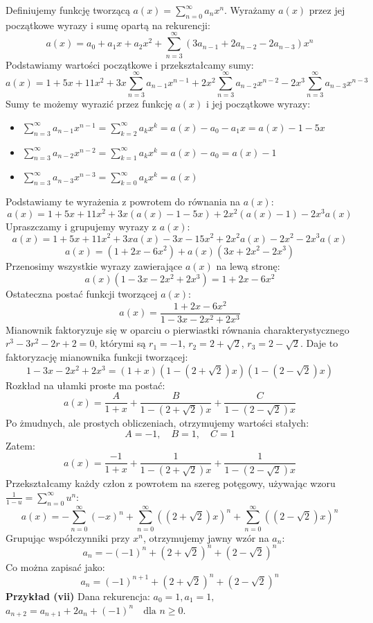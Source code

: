 \documentclass{mwart}
\begin{document}
\begin{mdframed}
    Definiujemy funkcję tworzącą $a(x) = \sum_{n=0}^{\infty} a_n x^n$.
    Wyrażamy $a(x)$ przez jej początkowe wyrazy i sumę opartą na rekurencji:
    $$ a(x) = a_0 + a_1 x + a_2 x^2 + \sum_{n=3}^{\infty} (3a_{n-1} + 2a_{n-2} - 2a_{n-3}) x^n $$
    Podstawiamy wartości początkowe i przekształcamy sumy:
    $$ a(x) = 1 + 5x + 11x^2 + 3x\sum_{n=3}^{\infty}a_{n-1}x^{n-1} + 2x^2\sum_{n=3}^{\infty}a_{n-2}x^{n-2} - 2x^3\sum_{n=3}^{\infty}a_{n-3}x^{n-3} $$
    Sumy te możemy wyrazić przez funkcję $a(x)$ i jej początkowe wyrazy:
    \begin{itemize}
        \item $ \sum_{n=3}^{\infty}a_{n-1}x^{n-1} = \sum_{k=2}^{\infty}a_{k}x^{k} = a(x) - a_0 - a_1x = a(x) - 1 - 5x $
        \item $ \sum_{n=3}^{\infty}a_{n-2}x^{n-2} = \sum_{k=1}^{\infty}a_{k}x^{k} = a(x) - a_0 = a(x) - 1 $
        \item $ \sum_{n=3}^{\infty}a_{n-3}x^{n-3} = \sum_{k=0}^{\infty}a_{k}x^{k} = a(x) $
    \end{itemize}
    Podstawiamy te wyrażenia z powrotem do równania na $a(x)$:
    $$ a(x) = 1 + 5x + 11x^2 + 3x(a(x) - 1 - 5x) + 2x^2(a(x) - 1) - 2x^3 a(x) $$
    Upraszczamy i grupujemy wyrazy z $a(x)$:
    $$ a(x) = 1 + 5x + 11x^2 + 3xa(x) - 3x - 15x^2 + 2x^2a(x) - 2x^2 - 2x^3a(x) $$
    $$ a(x) = (1 + 2x - 6x^2) + a(x)(3x + 2x^2 - 2x^3) $$
    Przenosimy wszystkie wyrazy zawierające $a(x)$ na lewą stronę:
    $$ a(x) (1 - 3x - 2x^2 + 2x^3) = 1 + 2x - 6x^2 $$
    Ostateczna postać funkcji tworzącej $a(x)$:
    $$ a(x) = \frac{1 + 2x - 6x^2}{1 - 3x - 2x^2 + 2x^3} $$
    Mianownik faktoryzuje się w oparciu o pierwiastki równania charakterystycznego $r^3 - 3r^2 - 2r + 2 = 0$, którymi są $r_1=-1$, $r_2=2+\sqrt{2}$, $r_3=2-\sqrt{2}$. Daje to faktoryzację mianownika funkcji tworzącej:
    $$ 1 - 3x - 2x^2 + 2x^3 = (1+x)(1-(2+\sqrt{2})x)(1-(2-\sqrt{2})x) $$
    Rozkład na ułamki proste ma postać:
    $$ a(x) = \frac{A}{1+x} + \frac{B}{1-(2+\sqrt{2})x} + \frac{C}{1-(2-\sqrt{2})x} $$
    Po żmudnych, ale prostych obliczeniach, otrzymujemy wartości stałych:
    $$ A = -1, \quad B = 1, \quad C = 1 $$
    Zatem:
    $$ a(x) = \frac{-1}{1+x} + \frac{1}{1-(2+\sqrt{2})x} + \frac{1}{1-(2-\sqrt{2})x} $$
    Przekształcamy każdy człon z powrotem na szereg potęgowy, używając wzoru $\frac{1}{1-u} = \sum_{n=0}^{\infty} u^n$:
    $$ a(x) = - \sum_{n=0}^{\infty} (-x)^n + \sum_{n=0}^{\infty} ((2+\sqrt{2})x)^n + \sum_{n=0}^{\infty} ((2-\sqrt{2})x)^n $$
    Grupując współczynniki przy $x^n$, otrzymujemy jawny wzór na $a_n$:
    $$ a_n = -(-1)^n + (2+\sqrt{2})^n + (2-\sqrt{2})^n $$
    Co można zapisać jako:
    $$ a_n = (-1)^{n+1} + (2+\sqrt{2})^n + (2-\sqrt{2})^n $$
    \textbf{Przykład (vii)} \newline
    Dana rekurencja:
    $a_0 = 1, a_1 = 1,$
    $a_{n+2} = a_{n+1} + 2a_n + (-1)^n \quad \text{dla } n \ge 0.$


\end{mdframed}
\end{document}
